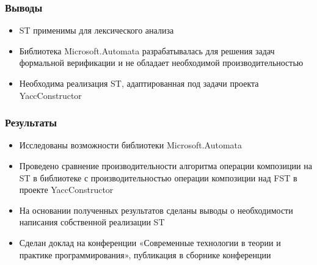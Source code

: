 \documentclass{beamer}
\begin{document}
\begin{frame}
  \transwipe[direction=90]
  \frametitle{Выводы}
  \begin{itemize}
    \item ST применимы для лексического анализа
    \item Библиотека Microsoft.Automata разрабатывалась для решения задач формальной верификации и не обладает необходимой производительностью
    \item Необходима реализация ST, адаптированная под задачи проекта YaccConstructor
  \end{itemize}
\end{frame}



\begin{frame}
  \transwipe[direction=90]
  \frametitle{Результаты}
  \begin{itemize}
    \item Исследованы возможности библиотеки Microsoft.Automata
    \item Проведено сравнение производительности алгоритма операции композиции на ST в библиотеке с производительностью операции композиции над FST в проекте YaccConstructor
    \item На основании полученных результатов сделаны выводы о необходимости написания собственной реализации ST
    \item Сделан доклад на конференции «Современные технологии в теории и практике программирования», публикация в сборнике конференции
  \end{itemize}
\end{frame}
\end{document}
